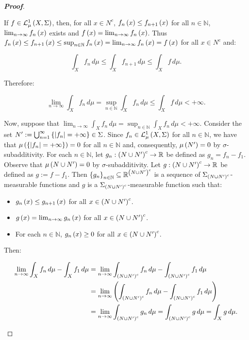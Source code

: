 \begin{theorem}
\begin{proof}[\rm\textbf{Proof}]
\begin{enumerate}
      If $f\in\mathcal{L}^1_{\mu}\left(X,\Sigma\right)$, then, for all $x\in N^c$, $f_n\left(x\right)\leq f_{n+1}\left(x\right)$ for all $n\in\mathbb{N}$, $\lim_{n\to\infty}{f_n\left(x\right)}$ exists and $f\left(x\right)=\lim_{n\to\infty}{f_n\left(x\right)}$. Thus $f_n\left(x\right)\leq f_{n+1}\left(x\right)\leq\sup_{n\in\mathbb{N}}{f_n\left(x\right)}=\lim_{n\to\infty}{f_n\left(x\right)}=f\left(x\right)$ for all $x\in N^c$ and:

      \begin{equation}
        \int_{X}{f_n\,d\mu}\leq\int_{X}{f_{n+1}\,d\mu}\leq\int_{X}{f\,d\mu}.
      \end{equation}

      Therefore:

      \begin{equation}
        \lim_{n\to\infty}{\int_{X}{f_n\,d\mu}}=\sup_{n\in\mathbb{N}}{\int_{X}{f_n\,d\mu}}\leq\int_{X}{f\,d\mu}<+\infty.
      \end{equation}

      Now, suppose that $\lim_{n\to\infty}{\int_{X}{f_n\,d\mu}}=\sup_{n\in\mathbb{N}}{\int_{X}{f_n\,d\mu}}<+\infty$. Consider the set $N':=\bigcup_{n=1}^{\infty}{\left\{\left|f_n\right|=+\infty\right\}}\in\Sigma$. Since $f_n\in\mathcal{L}^1_{\mu}\left(X,\Sigma\right)$ for all $n\in\mathbb{N}$, we have that $\mu\left(\left\{\left|f_n\right|=+\infty\right\}\right)=0$ for all $n\in\mathbb{N}$ and, consequently, $\mu\left(N'\right)=0$ by $\sigma$-subadditivity. For each $n\in\mathbb{N}$, let $g_n:\left(N\cup N'\right)^c\rightarrow\mathbb{R}$ be defined as $g_n=f_n-f_1$. Observe that $\mu\left(N\cup N'\right)=0$ by $\sigma$-subadditivity. Let $g:\left(N\cup N'\right)^c\rightarrow\mathbb{R}$ be defined as $g:=f-f_1$. Then $\left\{g_n\right\}_{n\in\mathbb{N}}\subseteq\mathbb{R}^{\left(N\cup N'\right)^c}$ is a sequence of $\Sigma_{\left(N\cup N'\right)^c}$-measurable functions and $g$ is a $\Sigma_{\left(N\cup N'\right)^c}$-measurable function such that:
      
      \begin{itemize}
        \item $g_n\left(x\right)\leq g_{n+1}\left(x\right)$ for all $x\in\left(N\cup N'\right)^c$.
        \item $g\left(x\right)=\lim_{n\to\infty}{g_n\left(x\right)}$ for all $x\in\left(N\cup N'\right)^c$.
        \item For each $n\in\mathbb{N}$, $g_n\left(x\right)\geq 0$ for all $x\in\left(N\cup N'\right)^c$.
      \end{itemize}
      
      Then:

      \begin{equation}
        \begin{split}
          \lim_{n\to\infty}{\int_{X}{f_n\,d\mu}}-\int_{X}{f_1\,d\mu} & =\lim_{n\to\infty}{\int_{\left(N\cup N'\right)^c}{f_n\,d\mu}}-\int_{\left(N\cup N'\right)^c}{f_1\,d\mu}\\
          & =\lim_{n\to\infty}{\left(\int_{\left(N\cup N'\right)^c}{f_n\,d\mu}-\int_{\left(N\cup N'\right)^c}{f_1\,d\mu}\right)}\\
          & =\lim_{n\to\infty}{\int_{\left(N\cup N'\right)^c}{g_n\,d\mu}}=\int_{\left(N\cup N'\right)^c}{g\,d\mu}=\int_{X}{g\,d\mu}.
        \end{split}
      \end{equation}


\end{enumerate}
\end{proof}
\end{theorem}
